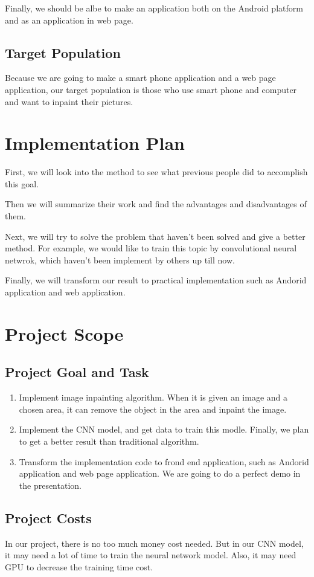 \documentclass[12pt]{article}
\begin{document}
\qquad Finally, we should be albe to make an application both on the Android platform and as an application in web page.
\subsection{Target Population}
\qquad Because we are going to make a smart phone application and a web page application, our target population is those who use smart phone and computer and want to inpaint their pictures.
\section{Implementation Plan}
\qquad First, we will look into the method to see what previous people did to accomplish this goal. 

\qquad Then we will summarize their work and find the advantages and disadvantages of them. 

\qquad Next, we will try to solve the problem that haven't been solved and give a better method. For example, we would like to train this topic by convolutional neural netwrok, which haven't been implement by others up till now. 

\qquad Finally, we will transform our result to practical implementation such as Andorid application and web application.



\section{Project Scope}
\subsection{Project Goal and Task}
\begin{enumerate}[1.]
	\item Implement image inpainting algorithm. When it is given an image and a chosen area, it can remove the object in the area and inpaint the image.
	\item Implement the CNN model, and get data to train this modle. Finally, we plan to get a better result than traditional algorithm.
	\item Transform the implementation code to frond end application, such as Andorid application and web page application. We are going to do a perfect demo in the presentation. 
\end{enumerate}
\subsection{Project Costs}
\qquad In our project, there is no too much money cost needed. But in our CNN model, it may need a lot of time to train the neural network model. Also, it may need GPU to decrease the training time cost.
\end{document}
